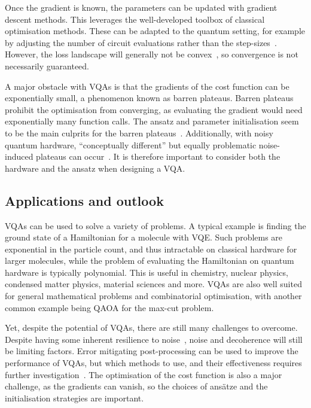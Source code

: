 Once the gradient is known, the parameters can be updated with gradient descent methods.
This leverages the well-developed toolbox of classical optimisation methods.
These can be adapted to the quantum setting, for example by adjusting the number of circuit evaluations rather than the step-sizes~\autocite{sweke2020}.
However, the loss landscape will generally not be convex~\autocite{huembeli2021}, so convergence is not necessarily guaranteed.

A major obstacle with VQAs is that the gradients of the cost function can be exponentially small, a phenomenon known as barren plateaus.
Barren plateaus prohibit the optimisation from converging, as evaluating the gradient would need exponentially many function calls.
The ansatz and parameter initialisation seem to be the main culprits for the barren plateaus~\autocite{mcclean2018, cerezo2021a}.
Additionally, with noisy quantum hardware, \enquote{conceptually different} but equally problematic noise-induced plateaus can occur~\autocite{wang2021}.
It is therefore important to consider both the hardware and the ansatz when designing a VQA.

\subsection{Applications and outlook}
VQAs can be used to solve a variety of problems.
A typical example is finding the ground state of a Hamiltonian for a molecule with VQE.
Such problems are exponential in the particle count, and thus intractable on classical hardware for larger molecules, while the problem of evaluating the Hamiltonian on quantum hardware is typically polynomial.
This is useful in chemistry, nuclear physics, condensed matter physics, material sciences and more.
VQAs are also well suited for general mathematical problems and combinatorial optimisation, with another common example being QAOA for the max-cut problem.

Yet, despite the potential of VQAs, there are still many challenges to overcome.
Despite having some inherent resilience to noise~\autocite{cerezo2021}, noise and decoherence will still be limiting factors.
Error mitigating post-processing can be used to improve the performance of VQAs, but which methods to use, and their effectiveness requires further investigation~\autocite{endo2021}.
The optimisation of the cost function is also a major challenge, as the gradients can vanish, so the choices of ansätze and the initialisation strategies are important.

